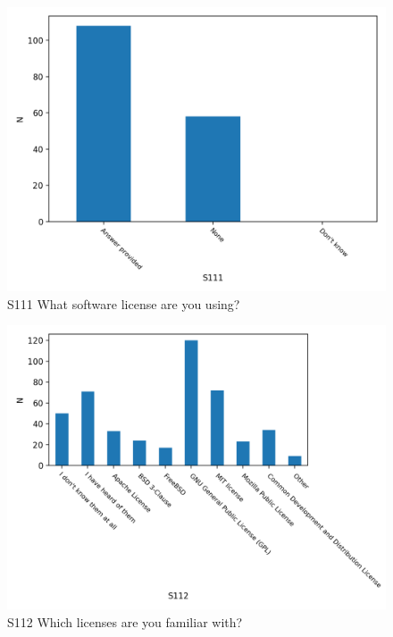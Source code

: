 \documentclass{article}
\begin{document}
\begin{figure}[!p]
    \centering
    \includegraphics[width=\textwidth]{../figs/S111.png}
	\caption{S111 What software license are you using? }
    \label{fig:S211}
\end{figure}

\begin{figure}[!p]
    \centering
    \includegraphics[width=\textwidth]{../figs/S112.png}
	\caption{S112 Which licenses are you familiar with?}
    \label{fig:S112}
\end{figure}
\end{document}
